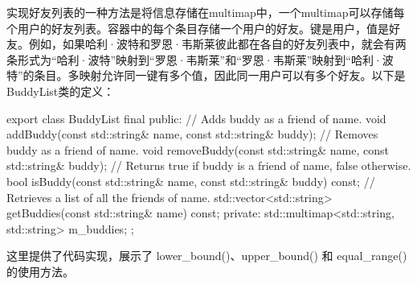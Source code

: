 实现好友列表的一种方法是将信息存储在multimap中，一个multimap可以存储每个用户的好友列表。容器中的每个条目存储一个用户的好友。键是用户，值是好友。例如，如果哈利·波特和罗恩·韦斯莱彼此都在各自的好友列表中，就会有两条形式为“哈利·波特”映射到“罗恩·韦斯莱”和“罗恩·韦斯莱”映射到“哈利·波特”的条目。多映射允许同一键有多个值，因此同一用户可以有多个好友。以下是BuddyList类的定义：


\begin{cpp}
export class BuddyList final
{
    public:
        // Adds buddy as a friend of name.
        void addBuddy(const std::string& name, const std::string& buddy);
        // Removes buddy as a friend of name.
        void removeBuddy(const std::string& name, const std::string& buddy);
        // Returns true if buddy is a friend of name, false otherwise.
        bool isBuddy(const std::string& name, const std::string& buddy) const;
        // Retrieves a list of all the friends of name.
        std::vector<std::string> getBuddies(const std::string& name) const;
    private:
        std::multimap<std::string, std::string> m_buddies;
};
\end{cpp}

这里提供了代码实现，展示了 lower\_bound()、upper\_bound() 和 equal\_range() 的使用方法。

